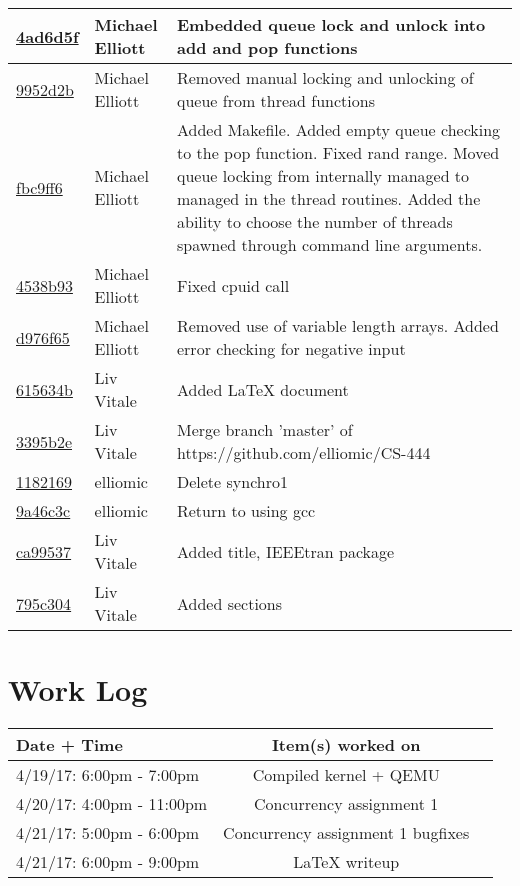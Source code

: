 \documentclass[letterpaper,10pt,titlepage,draftclsnofoot,onecolumn]{IEEEtran}
\begin{document}
\begin{tabular}{l l l}
\href{https://github.com/elliomic/CS-444/commit/4ad6d5f2f7a954616d7a38cb8cecd9c26fc3c5f3}{4ad6d5f} & Michael Elliott & Embedded queue lock and unlock into add and pop functions\\\hline
\href{https://github.com/elliomic/CS-444/commit/9952d2b8061cbde3abc5e0b6fb4430c04aaa28e7}{9952d2b} & Michael Elliott & Removed manual locking and unlocking of queue from thread functions\\\hline
\href{https://github.com/elliomic/CS-444/commit/fbc9ff6fcc38d42815a70a9a0efff13171a768ac}{fbc9ff6} & Michael Elliott & Added Makefile. Added empty queue checking to the pop function. Fixed rand range. Moved queue locking from internally managed to managed in the thread routines. Added the ability to choose the number of threads spawned through command line arguments.\\\hline
\href{https://github.com/elliomic/CS-444/commit/4538b939bed2cc80ab0b8940c419877d51f693bc}{4538b93} & Michael Elliott & Fixed cpuid call\\\hline
\href{https://github.com/elliomic/CS-444/commit/d976f657bc72165f444aac68eeecfdda2d2e1afe}{d976f65} & Michael Elliott & Removed use of variable length arrays. Added error checking for negative input\\\hline
\href{https://github.com/elliomic/CS-444/commit/615634bdd2be122c6401c6c7ccf23e457ca09c84}{615634b} & Liv Vitale & Added LaTeX document\\\hline
\href{https://github.com/elliomic/CS-444/commit/3395b2e4d682283838e8cb97063e5517bb5b5d30}{3395b2e} & Liv Vitale & Merge branch 'master' of https://github.com/elliomic/CS-444\\\hline
\href{https://github.com/elliomic/CS-444/commit/1182169eca1f04759352581b206d7715f24499ca}{1182169} & elliomic & Delete synchro1\\\hline
\href{https://github.com/elliomic/CS-444/commit/9a46c3c9bab82e9618cddc3e1ddca4f4e3ae0765}{9a46c3c} & elliomic & Return to using gcc\\\hline
\href{https://github.com/elliomic/CS-444/commit/ca99537566dcc4c0aa6cac3e045d5fefad09dd46}{ca99537} & Liv Vitale & Added title, IEEEtran package\\\hline
\href{https://github.com/elliomic/CS-444/commit/795c3046ccb4c7bab06b6d779d74d179c68776d6}{795c304} & Liv Vitale & Added sections\\\hline\end{tabular}


\section{Work Log}
\begin{tabular}{l | c | r}
Date + Time & Item(s) worked on \\
\hline
4/19/17: 6:00pm - 7:00pm & Compiled kernel + QEMU \\
4/20/17: 4:00pm - 11:00pm & Concurrency assignment 1 \\
4/21/17: 5:00pm - 6:00pm & Concurrency assignment 1 bugfixes \\
4/21/17: 6:00pm - 9:00pm & LaTeX writeup \\
\end{tabular}

\nocite{*}



\end{document}
